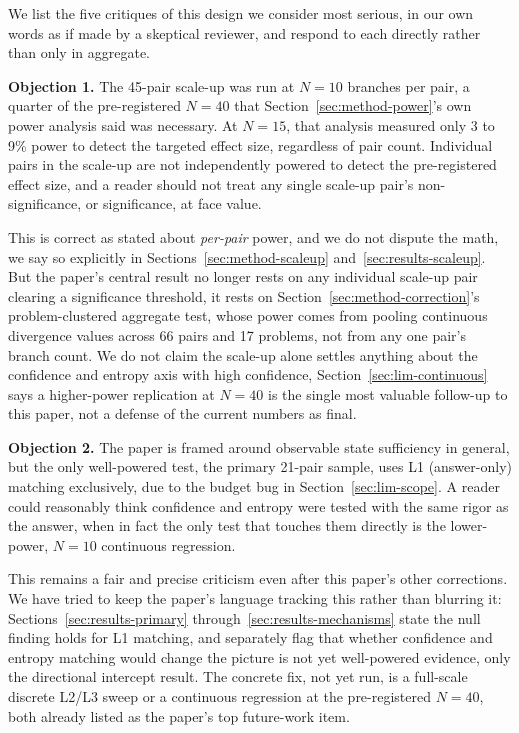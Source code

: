 \documentclass{article}
\begin{document}
We list the five critiques of this design we consider most serious, in our own words as if made by a skeptical reviewer, and respond to each directly rather than only in aggregate.

\textbf{Objection 1.} The 45-pair scale-up was run at $N=10$ branches per pair, a quarter of the pre-registered $N=40$ that Section~\ref{sec:method-power}'s own power analysis said was necessary. At $N=15$, that analysis measured only 3 to 9\% power to detect the targeted effect size, regardless of pair count. Individual pairs in the scale-up are not independently powered to detect the pre-registered effect size, and a reader should not treat any single scale-up pair's non-significance, or significance, at face value.

This is correct as stated about \emph{per-pair} power, and we do not dispute the math, we say so explicitly in Sections~\ref{sec:method-scaleup} and~\ref{sec:results-scaleup}. But the paper's central result no longer rests on any individual scale-up pair clearing a significance threshold, it rests on Section~\ref{sec:method-correction}'s problem-clustered aggregate test, whose power comes from pooling continuous divergence values across 66 pairs and 17 problems, not from any one pair's branch count. We do not claim the scale-up alone settles anything about the confidence and entropy axis with high confidence, Section~\ref{sec:lim-continuous} says a higher-power replication at $N=40$ is the single most valuable follow-up to this paper, not a defense of the current numbers as final.

\textbf{Objection 2.} The paper is framed around observable state sufficiency in general, but the only well-powered test, the primary 21-pair sample, uses L1 (answer-only) matching exclusively, due to the budget bug in Section~\ref{sec:lim-scope}. A reader could reasonably think confidence and entropy were tested with the same rigor as the answer, when in fact the only test that touches them directly is the lower-power, $N=10$ continuous regression.

This remains a fair and precise criticism even after this paper's other corrections. We have tried to keep the paper's language tracking this rather than blurring it: Sections~\ref{sec:results-primary} through~\ref{sec:results-mechanisms} state the null finding holds for L1 matching, and separately flag that whether confidence and entropy matching would change the picture is not yet well-powered evidence, only the directional intercept result. The concrete fix, not yet run, is a full-scale discrete L2/L3 sweep or a continuous regression at the pre-registered $N=40$, both already listed as the paper's top future-work item.
\end{document}
